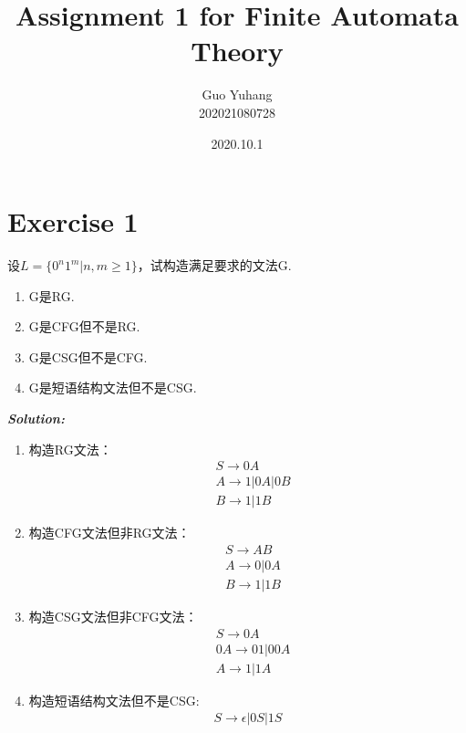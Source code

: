 \documentclass[a4paper]{ctexart}
\title{\textbf{Assignment 1 for Finite Automata Theory}}
\date{2020.10.1}
\author{Guo Yuhang \\ 202021080728
}
\begin{document}
\maketitle
\section*{Exercise 1}
 设$L=\{0^n1^m|n,m\geq 1\}$，试构造满足要求的文法G.
\begin{enumerate}[(1)]
\item G是RG.
\item G是CFG但不是RG.
\item G是CSG但不是CFG.
\item G是短语结构文法但不是CSG.
\end{enumerate}
\textbf{\emph{Solution:}}
\begin{enumerate}[(1)]
\item 构造RG文法：
\[
\begin{split}
&S\to 0A\\
&A\to 1|0A|0B\\
&B\to 1|1B
\end{split}
\]
\item 构造CFG文法但非RG文法：
\[
\begin{split}
&S\to AB\\
&A\to 0|0A\\
&B\to 1|1B
\end{split}
\]
\item 构造CSG文法但非CFG文法：
\[
\begin{split}
&S\to 0A\\
&0A\to 01|00A\\
&A\to 1|1A
\end{split}
\]
\item 构造短语结构文法但不是CSG:
\[
\begin{split}
S\to \epsilon|0S|1S\\
\end{split}
\]
\end{enumerate}
\end{document}
